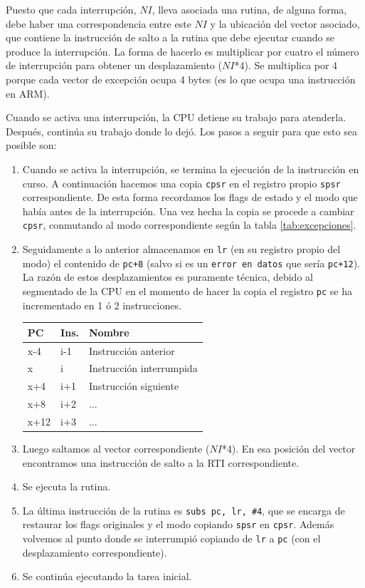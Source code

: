 Puesto que cada interrupción, $NI$, lleva asociada una rutina, de
alguna forma, debe haber una correspondencia entre este $NI$
y la ubicación del vector asociado, que contiene la instrucción de salto a la rutina que debe
ejecutar cuando se produce la interrupción. La forma de hacerlo es multiplicar por
cuatro el número de interrupción para obtener un desplazamiento
($NI$*4). Se multiplica por 4 porque cada vector de excepción
ocupa 4 bytes (es lo que ocupa una instrucción en ARM).

Cuando se activa una interrupción, la CPU detiene su trabajo para
atenderla. Después, continúa su trabajo donde lo dejó. Los pasos a
seguir para que esto sea posible son:

\begin{enumerate}
  \item Cuando se activa la interrupción, se termina la ejecución de la
    instrucción en curso. A continuación hacemos una copia {\tt cpsr} en el registro
    propio {\tt spsr} correspondiente. De esta forma recordamos los flags de estado
    y el modo que había antes de la interrupción. Una vez hecha la copia se
    procede a cambiar {\tt cpsr}, conmutando al modo correspondiente
    según la tabla \ref{tab:excepciones}.

  \item Seguidamente a lo anterior almacenamos en {\tt lr} (en su registro propio del modo)
    el contenido de {\tt pc+8} (salvo si es un {\tt error en datos} que sería
    {\tt pc+12}). La razón de estos
    desplazamientos es puramente técnica, debido al segmentado de la CPU en
    el momento de hacer la copia el registro {\tt pc} se ha incrementado en 1 ó
    2 instrucciones.

\begin{longtable}{ p{1.8cm} | p{2cm} | p{5cm} }
\hline
{\bf PC} & {\bf Ins.} & {\bf Nombre} \\ \hline
x-4  & i-1 & Instrucción anterior \\ \hline
x & i & Instrucción interrumpida \\ \hline
x+4 & i+1 & Instrucción siguiente \\ \hline
x+8 & i+2 & ...     \\ \hline
x+12 & i+3 & ... \\ \hline
\end{longtable}

  \item Luego saltamos al vector correspondiente ($NI$*4). En esa posición del vector
    encontramos una instrucción de salto a la RTI correspondiente.

  \item Se ejecuta la rutina.

  \item La última instrucción de la rutina es {\tt subs pc, lr, \#4}, que se encarga
    de restaurar los flags originales y el modo copiando {\tt spsr} en {\tt cpsr}.
    Además volvemos al punto donde se interrumpió copiando de {\tt lr} a {\tt pc} (con el
    desplazamiento correspondiente).

   \item Se continúa ejecutando la tarea inicial.
\end{enumerate}

